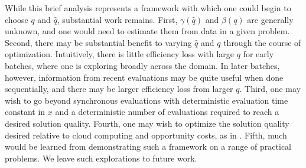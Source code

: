 \documentclass[paper=letter]{scrartcl}
\begin{document}
While this brief analysis represents a framework with which one could begin to choose $q$ and $\hat{q}$, substantial work remains.  First,  $\gamma(\hat{q})$ and $\beta(q)$ are generally unknown, and one would need to estimate them from data in a given problem.  Second, there may be substantial benefit to varying $\hat{q}$ and $q$ through the course of optimization. Intuitively, there is little efficiency loss with large $q$ for early batches, where one is exploring broadly across the domain.  In later batches, however, information from recent evaluations may be quite useful when done sequentially, and there may be larger efficiency loss from larger $q$.  Third, one may wish to go beyond synchronous evaluations with deterministic evaluation time constant in $x$ and a deterministic number of evaluations required to reach a desired solution quality.  Fourth, one may wish to optimize the solution quality desired relative to cloud computing and opportunity costs, as in \cite{chick2009economic,chick2012sequential}. Fifth, much would be learned from demonstrating such a framework on a range of practical problems.
We leave such explorations to future work.
\end{document}

